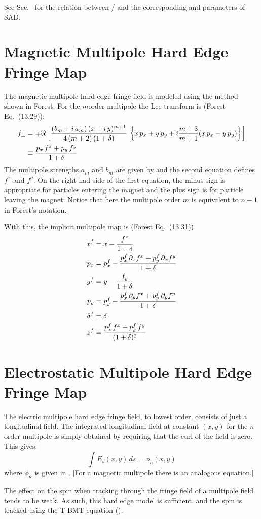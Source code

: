 See Sec.~ for the relation between  /  and
the corresponding  and  parameters of SAD.

\section{Magnetic Multipole Hard Edge Fringe Map}

The magnetic multipole hard edge fringe field is modeled using the method shown in
Forest\cite{b:forest}. For the $m$\Th order multipole the Lee transform 
is (Forest Eq.~(13.29)):
\begin{align}
  f_\pm &= \mp \Re \left[ \frac{(b_m + i \, a_m) \, 
    (x + i \, y)^{m+1}}{4 \, (m + 2) \, (1 + \delta)} \,
    \left\{ x \, p_x + y \, p_y + i \frac{m+3}{m+1} 
    (x \, p_x - y \, p_y) \right\} \right] \nonumber \\
  &\equiv \frac{p_x \, f^x + p_y \, f^y}{1 + \delta}
\end{align}
The multipole strengths $a_m$ and $b_m$ are given by 
and the second equation defines $f^x$ and $f^y$. On the right had side of the first
equation, the minus sign is appropriate for particles entering the magnet and the
plus sign is for particle leaving the magnet.
Notice that here the multipole order $m$ is equivalent to $n-1$ in Forest's notation.

With this, the implicit multipole map is (Forest Eq.~(13.31))
\begin{align}
  x^f &= x - \frac{f^x}{1 + \delta} \nonumber \\
  p_x &= p_x^f - \frac{p_x^f \, \partial_x f^x + p_y^f \, \partial_x f^y}{1 + \delta} \nonumber \\
  y^f &= y - \frac{f_y}{1 + \delta} \\
  p_y &= p_y^f - \frac{p_x^f \, \partial_y f^x + p_y^f \, \partial_y f^y}{1 + \delta} \nonumber \\
  \delta^f &= \delta \nonumber \\
  z^f &=\frac{p_x^f \, f^x + p_y^f \, f^y}{(1 + \delta)^2} \nonumber
\end{align}

\section{Electrostatic Multipole Hard Edge Fringe Map}
\label{s:spin.hard.fringe}

The electric multipole hard edge fringe field, to lowest order, consists of just a longitudinal
field. The integrated longitudinal field at constant $(x,y)$ for the $n$\Th order multipole is
simply obtained by requiring that the curl of the field is zero.  This gives:
\begin{equation}
  \int E_s(x,y) \, ds = \phi_n(x,y)
\end{equation}
where $\phi_n$ is given in . [For a magnetic multipole there is an analogous
equation.]

The effect on the spin when tracking through the fringe field of a multipole field tends
to be weak. As such, this hard edge model is sufficient.  and the spin is tracked using
the T-BMT equation ().
